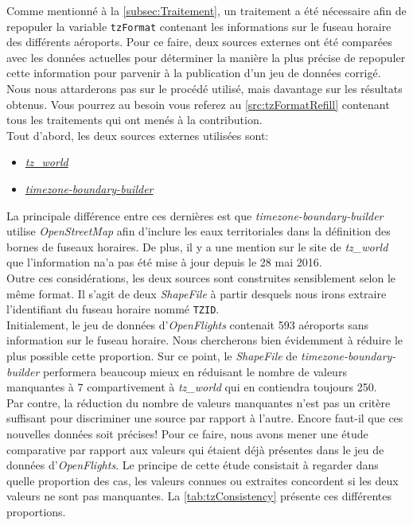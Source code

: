 Comme mentionné à la \autoref{subsec:Traitement}, un traitement a été nécessaire afin de repopuler la variable \texttt{tzFormat} contenant les informations sur le fuseau horaire des différents aéroports. Pour ce faire, deux sources externes ont été comparées avec les données actuelles pour déterminer la manière la plus précise de repopuler cette information pour parvenir à la publication d'un jeu de données corrigé. Nous nous attarderons pas sur le procédé utilisé, mais davantage sur les résultats obtenus. Vous pourrez au besoin vous referez au \autoref{src:tzFormatRefill} contenant tous les traitements qui ont menés à la contribution. \\

Tout d'abord, les deux sources externes utilisées sont:
\begin{itemize}
	\item \href{http://efele.net/maps/tz/world/}{\emph{tz\_world}}
	\item \href{https://github.com/evansiroky/timezone-boundary-builder}{\emph{{timezone-boundary-builder}}}
\end{itemize}
La principale différence entre ces dernières est que \emph{{timezone-boundary-builder}} utilise \emph{OpenStreetMap} afin d'inclure les eaux territoriales dans la définition des bornes de fuseaux horaires. De plus, il y a une mention sur le site de \emph{tz\_world} que l'information na'a pas été mise à jour depuis le 28 mai 2016. \\

Outre ces considérations, les deux sources sont construites sensiblement selon le même format. Il s'agit de deux \emph{ShapeFile} à partir desquels nous irons extraire l'identifiant du fuseau horaire nommé \texttt{TZID}. \\

Initialement, le jeu de données d'\emph{OpenFlights} contenait 593 aéroports sans information sur le fuseau horaire. Nous chercherons bien évidemment à réduire le plus possible cette proportion. Sur ce point, le \emph{ShapeFile} de \emph{{timezone-boundary-builder}} performera beaucoup mieux en réduisant le nombre de valeurs manquantes à 7 compartivement à \emph{tz\_world} qui en contiendra toujours 250. \\

Par contre, la réduction du nombre de valeurs manquantes n'est pas un critère suffisant pour discriminer une source par rapport à l'autre. Encore faut-il que ces nouvelles données soit précises! Pour ce faire, nous avons mener une étude comparative par rapport aux valeurs qui étaient déjà présentes dans le jeu de données d'\emph{OpenFlights}. Le principe de cette étude consistait à regarder dans quelle proportion des cas, les valeurs connues ou extraites concordent si les deux valeurs ne sont pas manquantes. La \autoref{tab:tzConsistency} présente ces différentes proportions.

